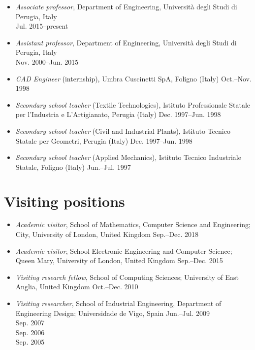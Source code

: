 \documentclass[11pt]{article}
\begin{document}
\begin{itemize}
	\item \emph{Associate professor}, Department of Engineering, Università degli Studi di Perugia, Italy \\ \mbox{} \hfill Jul. 2015--present
	\item \emph{Assistant professor}, Department of Engineering, Università degli Studi di Perugia, Italy \\ \mbox{} \hfill Nov. 2000--Jun. 2015
	\item \emph{CAD Engineer} (internship), Umbra Cuscinetti SpA, Foligno (Italy) \mbox{} \hfill Oct.--Nov. 1998
	\item \emph{Secondary school teacher} (Textile Technologies), Istituto Professionale Statale per l’Industria e L’Artigianato, Perugia (Italy) \mbox{} \hfill Dec. 1997--Jun. 1998
	\item \emph{Secondary school teacher} (Civil and Industrial Plants), Istituto Tecnico Statale per Geometri, Perugia (Italy) \mbox{} \hfill Dec. 1997--Jun. 1998
	\item \emph{Secondary school teacher} (Applied Mechanics), Istituto Tecnico Industriale Statale, Foligno (Italy) \mbox{} \hfill Jun.--Jul. 1997
\end{itemize} 

\section*{Visiting positions}

\begin{itemize}
	\item \emph{Academic visitor}, School of Mathematics, Computer Science and Engineering; City, University of London, United Kingdom \mbox{} \hfill Sep.--Dec. 2018
	\item \emph{Academic visitor}, School Electronic Engineering and Computer Science; Queen Mary, University of London, United Kingdom \mbox{} \hfill Sep.--Dec. 2015
	\item \emph{Visiting research fellow}, School of Computing Sciences; University of East Anglia, United Kingdom \mbox{} \hfill Oct.--Dec. 2010
	\item \emph{Visiting researcher}, School of Industrial Engineering, Department of Engineering Design; Universidade de Vigo, Spain \mbox{} \hfill Jun.--Jul. 2009
	\\ \mbox{} \hfill Sep. 2007
	\\ \mbox{} \hfill Sep. 2006
	\\ \mbox{} \hfill Sep. 2005
\end{itemize}
\end{document}
